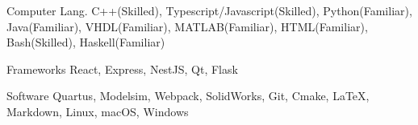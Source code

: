 

\begin{cvskills}

  \cvskill
    {Computer Lang.} %
    {C++(Skilled), Typescript/Javascript(Skilled), Python(Familiar), Java(Familiar), VHDL(Familiar), MATLAB(Familiar), HTML(Familiar), Bash(Skilled), Haskell(Familiar)} %

  \cvskill
    {Frameworks\phantom{aaa}} %
    {React, Express, NestJS, Qt, Flask} %

  \cvskill
    {Software\phantom{aaaaaa}} %
    {Quartus, Modelsim, Webpack, SolidWorks, Git, Cmake, LaTeX, Markdown, Linux, macOS, Windows} %


\end{cvskills}
